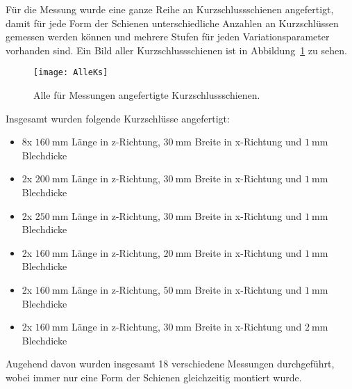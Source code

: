 F\"ur die Messung wurde eine ganze Reihe an Kurzschlussschienen angefertigt, damit f\"ur jede Form der Schienen unterschiedliche Anzahlen an Kurzschl\"ussen gemessen werden k\"onnen und mehrere Stufen f\"ur jeden Variationsparameter vorhanden sind. Ein Bild aller Kurzschlussschienen ist in Abbildung~\ref{fig:AlleKs} zu sehen.
\par
\begin{figure}[htb]
	\centering
	\texttt{[image: AlleKs]}
	\caption{Alle f\"ur Messungen angefertigte Kurzschlussschienen.}
	\label{fig:AlleKs}
\end{figure}
Insgesamt wurden folgende Kurzschl\"usse angefertigt:
\par
\begin{itemize}
	\item 8x $\SI{160}{\milli\meter}$ Länge in z-Richtung, $\SI{30}{\milli\meter}$ Breite in x-Richtung und $\SI{1}{\milli\meter}$ Blechdicke
	\item 2x $\SI{200}{\milli\meter}$ Länge in z-Richtung, $\SI{30}{\milli\meter}$ Breite in x-Richtung und $\SI{1}{\milli\meter}$ Blechdicke
	\item 2x $\SI{250}{\milli\meter}$ Länge in z-Richtung, $\SI{30}{\milli\meter}$ Breite in x-Richtung und $\SI{1}{\milli\meter}$ Blechdicke
	\item 2x $\SI{160}{\milli\meter}$ Länge in z-Richtung, $\SI{20}{\milli\meter}$ Breite in x-Richtung und $\SI{1}{\milli\meter}$ Blechdicke
	\item 2x $\SI{160}{\milli\meter}$ Länge in z-Richtung, $\SI{50}{\milli\meter}$ Breite in x-Richtung und $\SI{1}{\milli\meter}$ Blechdicke
	\item 2x $\SI{160}{\milli\meter}$ Länge in z-Richtung, $\SI{30}{\milli\meter}$ Breite in x-Richtung und $\SI{2}{\milli\meter}$ Blechdicke
\end{itemize}
Augehend davon wurden insgesamt 18 verschiedene Messungen durchgef\"uhrt, wobei immer nur eine Form der Schienen gleichzeitig montiert wurde.


\newpage



